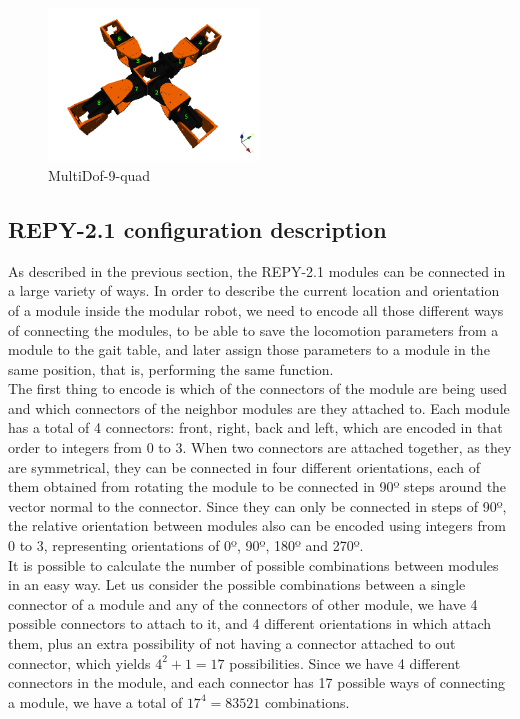\begin{figure}[h]
		\centering
        \includegraphics[width=0.5\textwidth]{images/Conf_repy2_multidof-9-quad.png}
        \caption{MultiDof-9-quad}
        \label{fig:config_repy2_multidof-9-quad}
\end{figure}



\subsection{REPY-2.1 configuration description}
\label{config_repy_description}
As described in the previous section, the REPY-2.1 modules can be connected in a large variety of ways. In order to describe the current location and orientation of a module inside the modular robot, we need to encode all those different ways of connecting the modules, to be able to save the locomotion parameters from a module to the gait table, and later assign those parameters to a module in the same position, that is, performing the same function.\\

The first thing to encode is which of the connectors of the module are being used and which connectors of the neighbor modules are they attached to. Each module has a total of 4 connectors: front, right, back and left, which are encoded in that order to integers from 0 to 3. When two connectors are attached together, as they are symmetrical, they can be connected in four different orientations, each of them obtained from rotating the module to be connected in 90º steps around the vector normal to the connector. Since they can only be connected in steps of 90º, the relative orientation between modules also can be encoded using integers from 0 to 3, representing orientations of 0º, 90º, 180º and 270º.\\

It is possible to calculate the number of possible combinations between modules in an easy way. Let us consider the possible combinations between a single connector of a module and any of the connectors of other module, we have 4 possible connectors to attach to it, and 4 different orientations in which attach them, plus an extra possibility of not having a connector attached to out connector, which yields $4^2+1 = 17$ possibilities. Since we have 4 different connectors in the module, and each connector has 17 possible ways of connecting a module, we have a total of $17^4 = 83521$ combinations.\\

